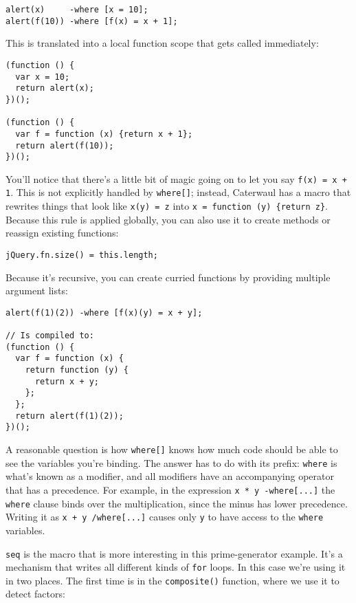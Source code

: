 \documentclass{report}
\begin{document}
\begin{verbatim}
alert(x)     -where [x = 10];
alert(f(10)) -where [f(x) = x + 1];
\end{verbatim}

    This is translated into a local function scope that gets called immediately:

\begin{verbatim}
(function () {
  var x = 10;
  return alert(x);
})();

(function () {
  var f = function (x) {return x + 1};
  return alert(f(10));
})();
\end{verbatim}

    You'll notice that there's a little bit of magic going on to let you say {\tt f(x) = x + 1}. This is not explicitly handled by {\tt where[]}; instead, Caterwaul has a macro that rewrites
    things that look like {\tt x(y) = z} into \verb|x = function (y) {return z}|. Because this rule is applied globally, you can also use it to create methods or reassign existing functions:

\begin{verbatim}
jQuery.fn.size() = this.length;
\end{verbatim}

    Because it's recursive, you can create curried functions by providing multiple argument lists:

\begin{verbatim}
alert(f(1)(2)) -where [f(x)(y) = x + y];

// Is compiled to:
(function () {
  var f = function (x) {
    return function (y) {
      return x + y;
    };
  };
  return alert(f(1)(2));
})();
\end{verbatim}

    A reasonable question is how {\tt where[]} knows how much code should be able to see the variables you're binding. The answer has to do with its prefix: {\tt where} is what's known as a
    modifier, and all modifiers have an accompanying operator that has a precedence. For example, in the expression {\tt x * y -where[...]} the {\tt where} clause binds over the
    multiplication, since the minus has lower precedence. Writing it as {\tt x + y /where[...]} causes only {\tt y} to have access to the {\tt where} variables.

    {\tt seq} is the macro that is more interesting in this prime-generator example. It's a mechanism that writes all different kinds of {\tt for} loops. In this case we're using it in two
    places. The first time is in the {\tt composite()} function, where we use it to detect factors:
\end{document}
